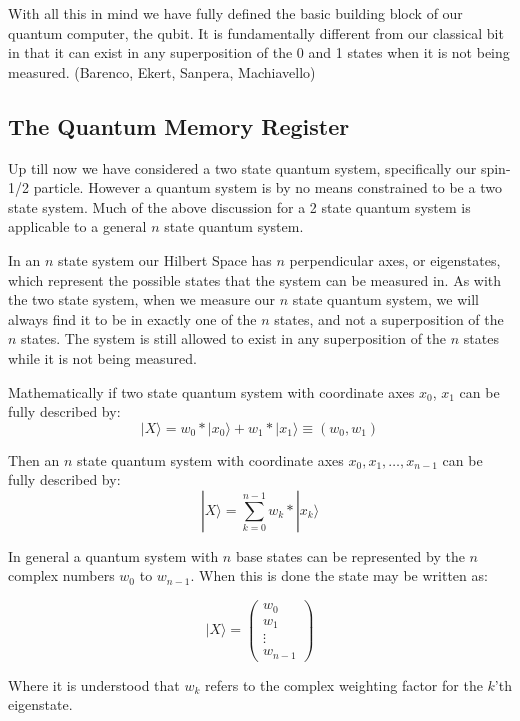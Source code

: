 \documentclass[]{article}
\begin{document}
With all this in mind we have fully defined the basic building block
of our quantum computer, the qubit.  It is fundamentally different
from our classical bit in that it can exist in any superposition of
the 0 and 1 states when it is not being measured. (Barenco, Ekert,
Sanpera, Machiavello)

\subsection{The Quantum Memory Register}

Up till now we have considered a two state quantum system,
specifically our spin-1/2 particle.  However a quantum system is by no
means constrained to be a two state system.  Much of the above
discussion for a 2 state quantum system is applicable to a general $n$
state quantum system.

In an $n$ state system our Hilbert Space has $n$ perpendicular axes,
or eigenstates, which represent the possible states that the system
can be measured in.  As with the two state system, when we measure our
$n$ state quantum system, we will always find it to be in exactly one
of the $n$ states, and not a superposition of the $n$ states.  The
system is still allowed to exist in any superposition of the $n$
states while it is not being measured.

Mathematically if two state quantum system with coordinate axes
$x_{0}$, $x_{1}$ can be fully described by:
	\[|X \rangle = w_{0} * |x_{0} \rangle + w_{1} * |x_{1} \rangle \equiv (w_{0},w_{1})\]

Then an $n$ state quantum system with coordinate axes $x_{0},
x_{1},\ldots, x_{n-1}$ can be fully described by:
	\[|X \rangle = \sum_{k = 0}^{n-1} w_{k} * |x_{k} \rangle \]

In general a quantum system with $n$ base states can be represented by
the $n$ complex numbers $w_{0}$ to $w_{n-1}$. When this is done the
state may be written as:
	
\[ |X \rangle = \left( \begin{array}{c} 
		w_{0} \\ 
		w_{1} \\ 
		\vdots \\ 
		w_{n-1}
\end{array} \right) \]

Where it is understood that $w_{k}$ refers to the complex weighting
factor for the $k$'th eigenstate.
\end{document}
